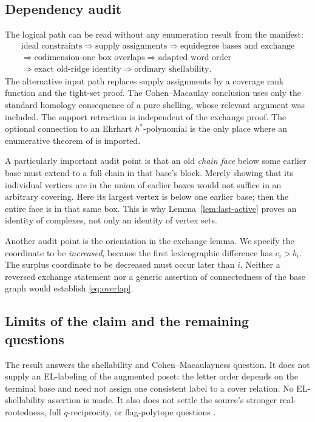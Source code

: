 \documentclass[11pt]{article}
\numberwithin{equation}{section}
\theoremstyle{definition}
\theoremstyle{remark}
\begin{document}
\subsection{Dependency audit}

The logical path can be read without any enumeration result from the
manifest:
\[
\begin{gathered}
 \text{ideal constraints}
 \Longrightarrow \text{supply assignments}
 \Longrightarrow \text{equidegree bases and exchange}\\
 \Longrightarrow \text{codimension-one box overlaps}
 \Longrightarrow \text{adapted word order}\\
 \Longrightarrow \text{exact old-ridge identity}
 \Longrightarrow \text{ordinary shellability}.
\end{gathered}
\]
The alternative input path replaces supply assignments by a coverage rank
function and the tight-set proof. The Cohen--Macaulay conclusion uses only
the standard homology consequence of a pure shelling, whose relevant argument
was included. The support retraction is independent of the exchange proof.
The optional connection to an Ehrhart $h^*$-polynomial is the only place
where an enumerative theorem of \cite{AC} is imported.

A particularly important audit point is that an old \emph{chain face} below
some earlier base must extend to a full chain in that base's block. Merely
showing that its individual vertices are in the union of earlier boxes would
not suffice in an arbitrary covering. Here its largest vertex is below one
earlier base; then the entire face is in that same box. This is why
Lemma~\ref{lem:last-active} proves an identity of complexes, not only an
identity of vertex sets.

Another audit point is the orientation in the exchange lemma. We specify the
coordinate to be \emph{increased}, because the first lexicographic difference
has $c_i>b_i$. The surplus coordinate to be decreased must occur later than
$i$. Neither a reversed exchange statement nor a generic assertion of
connectedness of the base graph would establish \eqref{eq:overlap}.

\subsection{Limits of the claim and the remaining questions}

The result answers the shellability and Cohen--Macaulayness question. It does
not supply an EL-labeling of the augmented poset: the letter order depends
on the terminal base and need not assign one consistent label to a cover
relation. No EL-shellability assertion is made. It also does not settle the
source's stronger real-rootedness, full $q$-reciprocity, or flag-polytope
questions \cite{AC}.
\end{document}
